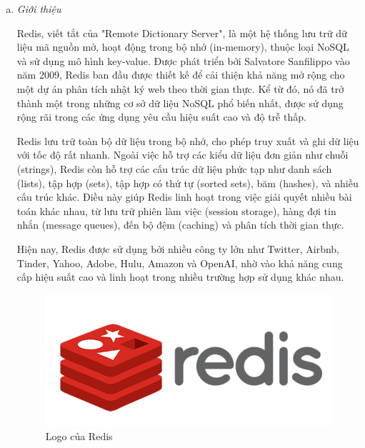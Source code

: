     \begin{enumerate}[(a)]
        \item \textit{Giới thiệu}

        Redis, viết tắt của "Remote Dictionary Server", là một hệ thống lưu trữ dữ liệu mã nguồn mở, hoạt động trong bộ nhớ (in-memory), thuộc loại NoSQL và sử dụng mô hình key-value. Được phát triển bởi Salvatore Sanfilippo vào năm 2009, Redis ban đầu được thiết kế để cải thiện khả năng mở rộng cho một dự án phân tích nhật ký web theo thời gian thực. Kể từ đó, nó đã trở thành một trong những cơ sở dữ liệu NoSQL phổ biến nhất, được sử dụng rộng rãi trong các ứng dụng yêu cầu hiệu suất cao và độ trễ thấp. 

        Redis lưu trữ toàn bộ dữ liệu trong bộ nhớ, cho phép truy xuất và ghi dữ liệu với tốc độ rất nhanh. Ngoài việc hỗ trợ các kiểu dữ liệu đơn giản như chuỗi (strings), Redis còn hỗ trợ các cấu trúc dữ liệu phức tạp như danh sách (lists), tập hợp (sets), tập hợp có thứ tự (sorted sets), băm (hashes), và nhiều cấu trúc khác. Điều này giúp Redis linh hoạt trong việc giải quyết nhiều bài toán khác nhau, từ lưu trữ phiên làm việc (session storage), hàng đợi tin nhắn (message queues), đến bộ đệm (caching) và phân tích thời gian thực.

        Hiện nay, Redis được sử dụng bởi nhiều công ty lớn như Twitter, Airbnb, Tinder, Yahoo, Adobe, Hulu, Amazon và OpenAI, nhờ vào khả năng cung cấp hiệu suất cao và linh hoạt trong nhiều trường hợp sử dụng khác nhau.

        \begin{figure}[H]
            \centering
            \includegraphics[width=15cm]{Images/redis.png}
            \vspace{0.5cm}
            \caption{Logo của Redis}
            \label{fig:my_label}
        \end{figure}
        

\end{enumerate}
